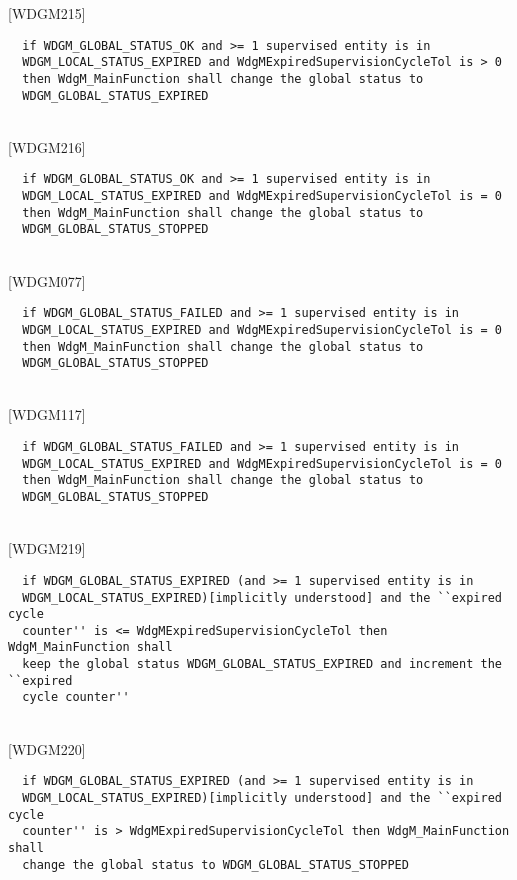 \documentclass[11pt,a4paper]{article}
\begin{document}
[WDGM215]
\begin{lstlisting}
  if WDGM_GLOBAL_STATUS_OK and >= 1 supervised entity is in
  WDGM_LOCAL_STATUS_EXPIRED and WdgMExpiredSupervisionCycleTol is > 0
  then WdgM_MainFunction shall change the global status to
  WDGM_GLOBAL_STATUS_EXPIRED
\end{lstlisting}~\\

[WDGM216]
\begin{lstlisting}
  if WDGM_GLOBAL_STATUS_OK and >= 1 supervised entity is in
  WDGM_LOCAL_STATUS_EXPIRED and WdgMExpiredSupervisionCycleTol is = 0
  then WdgM_MainFunction shall change the global status to
  WDGM_GLOBAL_STATUS_STOPPED
\end{lstlisting}~\\

[WDGM077]
\begin{lstlisting}
  if WDGM_GLOBAL_STATUS_FAILED and >= 1 supervised entity is in
  WDGM_LOCAL_STATUS_EXPIRED and WdgMExpiredSupervisionCycleTol is = 0
  then WdgM_MainFunction shall change the global status to
  WDGM_GLOBAL_STATUS_STOPPED
\end{lstlisting}~\\

[WDGM117]
\begin{lstlisting}
  if WDGM_GLOBAL_STATUS_FAILED and >= 1 supervised entity is in
  WDGM_LOCAL_STATUS_EXPIRED and WdgMExpiredSupervisionCycleTol is = 0
  then WdgM_MainFunction shall change the global status to
  WDGM_GLOBAL_STATUS_STOPPED
\end{lstlisting}~\\

[WDGM219]
\begin{lstlisting}
  if WDGM_GLOBAL_STATUS_EXPIRED (and >= 1 supervised entity is in
  WDGM_LOCAL_STATUS_EXPIRED)[implicitly understood] and the ``expired cycle
  counter'' is <= WdgMExpiredSupervisionCycleTol then WdgM_MainFunction shall
  keep the global status WDGM_GLOBAL_STATUS_EXPIRED and increment the ``expired
  cycle counter''
\end{lstlisting}~\\

[WDGM220]
\begin{lstlisting}
  if WDGM_GLOBAL_STATUS_EXPIRED (and >= 1 supervised entity is in
  WDGM_LOCAL_STATUS_EXPIRED)[implicitly understood] and the ``expired cycle
  counter'' is > WdgMExpiredSupervisionCycleTol then WdgM_MainFunction shall
  change the global status to WDGM_GLOBAL_STATUS_STOPPED
\end{lstlisting}~\\
\end{document}
